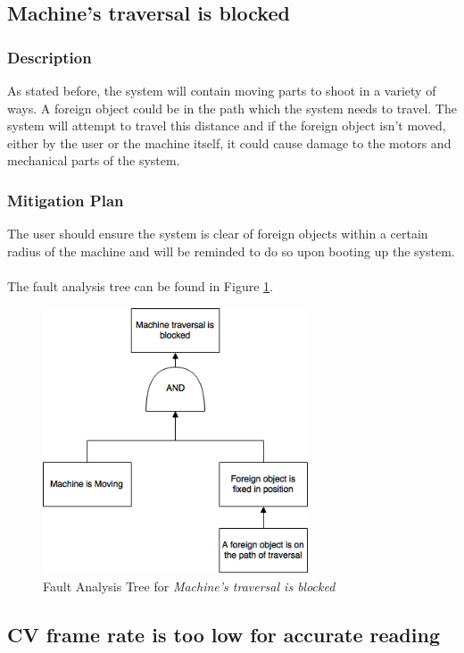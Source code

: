 \documentclass[11pt]{article}
\begin{document}
\subsection{Machine's traversal is blocked}
\subsubsection*{Description}
As stated before, the system will contain moving parts to shoot in a variety of ways. A foreign object could be in the path which the system needs to travel. The system will attempt to travel this distance and if the foreign object isn't moved, either by the user or the machine itself, it could cause damage to the motors and mechanical parts of the system.
\subsubsection*{Mitigation Plan}
The user should ensure the system is clear of foreign objects within a certain radius of the machine and will be reminded to do so upon booting up the system. \\ \\

The fault analysis tree can be found in Figure \ref{fig:ft-traverse}.

\begin{figure}[H]
   \centering
   \includegraphics[width=0.7\textwidth]{img/ft-traverse.png} %
   \caption{Fault Analysis Tree for \textit{Machine's traversal is blocked}}
   \label{fig:ft-traverse}
\end{figure}

\subsection{CV frame rate is too low for accurate reading}
\end{document}
